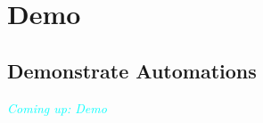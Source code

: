 \section{Demo}\label{sec:demo}
\subsection{Demonstrate Automations}\label{subsec:demo-demonstrate-automations}

\begin{frame}
	\begin{center}
		\Huge \textcolor{cyan}{\emph{Coming up: Demo}}
	\end{center}
\end{frame}
